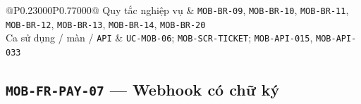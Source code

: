 \begin{longtable}{@{}P{0.23000\SRSWidth}P{0.77000\SRSWidth}@{}}
Quy tắc nghiệp vụ & \texttt{MOB-\allowbreak{}BR-\allowbreak{}09}, \texttt{MOB-\allowbreak{}BR-\allowbreak{}10}, \texttt{MOB-\allowbreak{}BR-\allowbreak{}11}, \texttt{MOB-\allowbreak{}BR-\allowbreak{}12}, \texttt{MOB-\allowbreak{}BR-\allowbreak{}13}, \texttt{MOB-\allowbreak{}BR-\allowbreak{}14}, \texttt{MOB-\allowbreak{}BR-\allowbreak{}20} \\[3pt]
Ca sử dụng /\allowbreak{} màn /\allowbreak{} \texttt{API} & \texttt{UC-\allowbreak{}MOB-\allowbreak{}06}; \texttt{MOB-\allowbreak{}SCR-\allowbreak{}TICKET}; \texttt{MOB-\allowbreak{}API-\allowbreak{}015}, \texttt{MOB-\allowbreak{}API-\allowbreak{}033} \\[3pt]
\end{longtable}
\endgroup

\subsection{\texttt{MOB-\allowbreak{}FR-\allowbreak{}PAY-\allowbreak{}07} — Webhook có chữ ký}
\begingroup
\fontsize{9.5}{12}\selectfont
\setlength{\SRSWidth}{\dimexpr\linewidth-2\tabcolsep\relax}
